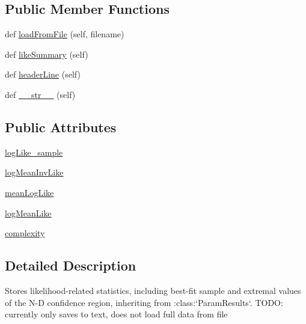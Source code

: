 \subsection*{Public Member Functions}
\begin{DoxyCompactItemize}
\item 
def \mbox{\hyperlink{classgetdist_1_1types_1_1LikeStats_a7d2796576ba424f62edee6ae05ce37a2}{load\+From\+File}} (self, filename)
\item 
def \mbox{\hyperlink{classgetdist_1_1types_1_1LikeStats_a6aa2cc1ed178c43b46cdb529d9be5b1f}{like\+Summary}} (self)
\item 
def \mbox{\hyperlink{classgetdist_1_1types_1_1LikeStats_affb93f8ca31099d4168b00a6beceb015}{header\+Line}} (self)
\item 
def \mbox{\hyperlink{classgetdist_1_1types_1_1LikeStats_a3ce71c62a144f3267a48a82e45bc35fa}{\+\_\+\+\_\+str\+\_\+\+\_\+}} (self)
\end{DoxyCompactItemize}
\subsection*{Public Attributes}
\begin{DoxyCompactItemize}
\item 
\mbox{\hyperlink{classgetdist_1_1types_1_1LikeStats_aa146837606828d529c748a30971c6a90}{log\+Like\+\_\+sample}}
\item 
\mbox{\hyperlink{classgetdist_1_1types_1_1LikeStats_ad9fc26e7f4bd3acb6a0a48bd22da0199}{log\+Mean\+Inv\+Like}}
\item 
\mbox{\hyperlink{classgetdist_1_1types_1_1LikeStats_a8f32c4b3a7dd7ff655d7e0ba28df8528}{mean\+Log\+Like}}
\item 
\mbox{\hyperlink{classgetdist_1_1types_1_1LikeStats_a1a313f75f9bed09e15629197724050bd}{log\+Mean\+Like}}
\item 
\mbox{\hyperlink{classgetdist_1_1types_1_1LikeStats_a97f7463f7524cca0c910cd930f72849d}{complexity}}
\end{DoxyCompactItemize}


\subsection{Detailed Description}
\begin{DoxyVerb}Stores likelihood-related statistics, including best-fit sample and extremal values of the N-D confidence region, 
inheriting from :class:`ParamResults`. 
TODO: currently only saves to text, does not load full data from file
\end{DoxyVerb}
 

